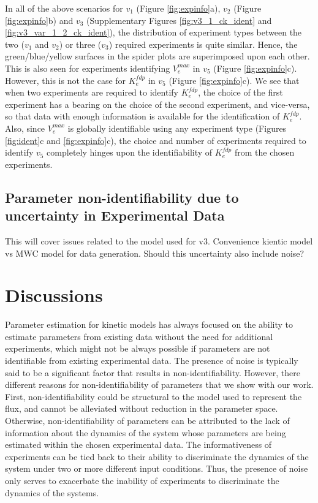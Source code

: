 \documentclass[10pt]{article}
\begin{document}
	In all of the above scenarios for $v_1$ (Figure \ref{fig:expinfo}a), $v_2$ (Figure \ref{fig:expinfo}b) and $v_3$ (Supplementary Figures \ref{fig:v3_1_ck_ident} and \ref{fig:v3_var_1_2_ck_ident}), the distribution of experiment types between the two ($v_1$ and $v_2$) or three ($v_3$) required experiments is quite similar. Hence, the green/blue/yellow surfaces in the spider plots are superimposed upon each other. This is also seen for experiments identifying $V_e^{max}$ in $v_5$ (Figure \ref{fig:expinfo}c). However, this is not the case for $K_e^{fdp}$ in $v_5$ (Figure \ref{fig:expinfo}c). We see that when two experiments are required to identify $K_e^{fdp}$, the choice of the first experiment has a bearing on the choice of the second experiment, and vice-versa, so that data with enough information is available for the identification of $K_e^{fdp}$. Also, since $V_e^{max}$ is globally identifiable using any experiment type (Figures \ref{fig:ident}c and \ref{fig:expinfo}c), the choice and number of experiments required to identify $v_5$ completely hinges upon the identifiability of $K_e^{fdp}$ from the chosen experiments.		
	
	\subsection{Parameter non-identifiability due to uncertainty in Experimental Data}\label{sec:uncertainty}
	
	
	This will cover issues related to the model used for v3. Convenience kientic model vs MWC model for data generation. Should this uncertainty also include noise?			
	
	
	
	\section{Discussions}\label{sec:discussion}	
	Parameter estimation for kinetic models has always focused on the ability to estimate parameters from existing data without the need for additional experiments, which might not be always possible if parameters are not identifiable from existing experimental data. The presence of noise is typically said to be a significant factor that results in non-identifiability. However, there different reasons for non-identifiability of parameters that we show with our work. First, non-identifiability could be structural to the model used to represent the flux, and cannot be alleviated without reduction in the parameter space. Otherwise, non-identifiability of parameters can be attributed to the lack of information about the dynamics of the system whose parameters are being estimated within the chosen experimental data. The informativeness of experiments can be tied back to their ability to discriminate the dynamics of the system under two or more different input conditions. Thus, the presence of noise only serves to exacerbate the inability of experiments to discriminate the dynamics of the systems. 
	
\end{document}
